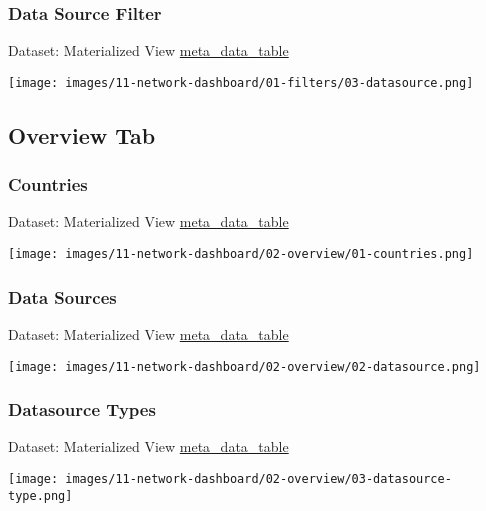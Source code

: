 \documentclass[
]{book}
\begin{document}
\hypertarget{data-source-filter}{%
\subsubsection*{Data Source Filter}\label{data-source-filter}}

Dataset: Materialized View \href{materialized-views-1.html\#meta_data_table}{meta\_data\_table}

\texttt{[image: images/11-network-dashboard/01-filters/03-datasource.png]}

\hypertarget{overview-tab}{%
\subsection*{Overview Tab}\label{overview-tab}}

\hypertarget{countries}{%
\subsubsection*{Countries}\label{countries}}

Dataset: Materialized View \href{materialized-views-1.html\#meta_data_table}{meta\_data\_table}

\texttt{[image: images/11-network-dashboard/02-overview/01-countries.png]}

\hypertarget{data-sources-1}{%
\subsubsection*{Data Sources}\label{data-sources-1}}

Dataset: Materialized View \href{materialized-views-1.html\#meta_data_table}{meta\_data\_table}

\texttt{[image: images/11-network-dashboard/02-overview/02-datasource.png]}

\hypertarget{datasource-types}{%
\subsubsection*{Datasource Types}\label{datasource-types}}

Dataset: Materialized View \href{materialized-views-1.html\#meta_data_table}{meta\_data\_table}

\texttt{[image: images/11-network-dashboard/02-overview/03-datasource-type.png]}
\end{document}
